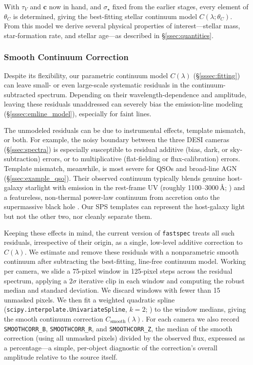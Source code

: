 \documentclass[modern,linenumbers]{aastex702}
\newcommand{\fastspec}{\texttt{fastspec}}
\newcommand{\vdisp}{\ensuremath{\sigma_\star}}
\newcommand{\tauv}{\ensuremath{\tau_V}}
\begin{document}
With $\tauv$ and $\mathbf{c}$ now in hand, and $\vdisp$ fixed
from the earlier stages, every element of $\theta_C$ is determined,
giving the best-fitting stellar continuum model
$C(\lambda;\theta_C)$. From this model we derive several physical
properties of interest---stellar mass, star-formation rate, and
stellar age---as described in \S\ref{ssec:quantities}.

\subsubsection{Smooth Continuum Correction}
\label{sssec:smooth}

Despite its flexibility, our parametric continuum model $C(\lambda)$
(\S\ref{sssec:fitting}) can leave small- or even large-scale
systematic residuals in the continuum-subtracted spectrum. Depending
on their wavelength-dependence and amplitude, leaving these residuals
unaddressed can severely bias the emission-line modeling
(\S\ref{sssec:emline_model}), especially for faint lines.

The unmodeled residuals can be due to instrumental effects, template
mismatch, or both. For example, the noisy boundary between the three
DESI cameras (\S\ref{ssec:spectra}) is especially susceptible to
residual additive (bias, dark, or sky-subtraction) errors, or to
multiplicative (flat-fielding or flux-calibration) errors. Template
mismatch, meanwhile, is most severe for QSOs and broad-line AGN
(\S\ref{ssec:example_qso}). Their observed continuum typically blends
genuine host-galaxy starlight with  emission in the
rest-frame UV (roughly 1100--3000\,\AA; \citealt{vestergaard01a}) and
a featureless, non-thermal power-law continuum from accretion onto the
supermassive black hole \citep{vanden-berk01a}. Our SPS templates can
represent the host-galaxy light but not the other two, nor cleanly
separate them.

Keeping these effects in mind, the current version of \fastspec{}
treats all such residuals, irrespective of their origin, as a single,
low-level additive correction to $C(\lambda)$. We estimate and remove
these residuals with a nonparametric smooth continuum after
subtracting the best-fitting, line-free continuum model. Working per
camera, we slide a 75-pixel window in 125-pixel steps across the
residual spectrum, applying a $2\sigma$ iterative clip in each window
and computing the robust median and standard deviation. We discard
windows with fewer than 15 unmasked pixels. We then fit a weighted
quadratic spline (\texttt{scipy.interpolate.UnivariateSpline}, $k=2$;
\citealt{virtanen20a}) to the window medians, giving the smooth
continuum correction $C_\mathrm{smooth}(\lambda)$. For each camera we
also record \texttt{SMOOTHCORR\_B}, \texttt{SMOOTHCORR\_R}, and
\texttt{SMOOTHCORR\_Z}, the median of the smooth correction (using all
unmasked pixels) divided by the observed flux, expressed as a
percentage---a simple, per-object diagnostic of the correction's
overall amplitude relative to the source itself.
\end{document}
